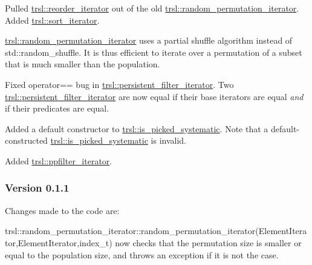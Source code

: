 \begin{DoxyItemize}
\item Pulled \hyperlink{classtrsl_1_1reorder__iterator}{trsl::reorder\_\-iterator} out of the old \hyperlink{namespacetrsl_afb566791dfade70af49beaa5b816e7ee}{trsl::random\_\-permutation\_\-iterator}. Added \hyperlink{namespacetrsl_aa23892a3c8929e627df1618c6b5dd2df}{trsl::sort\_\-iterator}.
\end{DoxyItemize}


\begin{DoxyItemize}
\item \hyperlink{namespacetrsl_afb566791dfade70af49beaa5b816e7ee}{trsl::random\_\-permutation\_\-iterator} uses a partial shuffle algorithm instead of std::random\_\-shuffle. It is thus efficient to iterate over a permutation of a subset that is much smaller than the population.
\end{DoxyItemize}


\begin{DoxyItemize}
\item Fixed {\ttfamily operator==} bug in \hyperlink{classtrsl_1_1persistent__filter__iterator}{trsl::persistent\_\-filter\_\-iterator}. Two \hyperlink{classtrsl_1_1persistent__filter__iterator}{trsl::persistent\_\-filter\_\-iterator} are now equal if their base iterators are equal {\itshape and\/} if their predicates are equal.
\end{DoxyItemize}


\begin{DoxyItemize}
\item Added a default constructor to \hyperlink{classtrsl_1_1is__picked__systematic}{trsl::is\_\-picked\_\-systematic}. Note that a default-\/constructed \hyperlink{classtrsl_1_1is__picked__systematic}{trsl::is\_\-picked\_\-systematic} is invalid.
\end{DoxyItemize}


\begin{DoxyItemize}
\item Added \hyperlink{classtrsl_1_1ppfilter__iterator}{trsl::ppfilter\_\-iterator}.
\end{DoxyItemize}\hypertarget{group__version__history_version_history_v011}{}\subsubsection{Version 0.1.1}\label{group__version__history_version_history_v011}
Changes made to the code are:


\begin{DoxyItemize}
\item trsl::random\_\-permutation\_\-iterator::random\_\-permutation\_\-iterator(ElementIterator,ElementIterator,index\_\-t) now checks that the permutation size is smaller or equal to the population size, and throws an exception if it is not the case.
\end{DoxyItemize}


